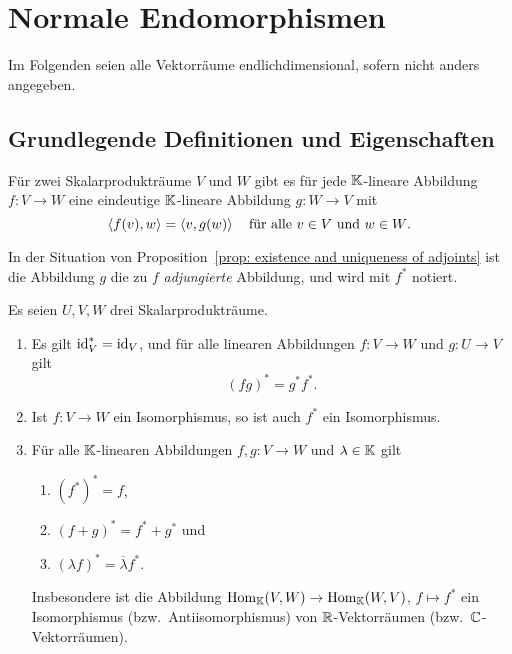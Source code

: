 \section{Normale Endomorphismen}
Im Folgenden seien alle Vektorräume endlichdimensional, sofern nicht anders angegeben.










\subsection{Grundlegende Definitionen und Eigenschaften}


\begin{proposition}\label{prop: existence and uniqueness of adjoints}
  Für zwei Skalarprodukträume $V$ und $W$ gibt es für jede $\mathbb{K}$-lineare Abbildung $f \colon V \to W$ eine eindeutige $\mathbb{K}$-lineare Abbildung $g \colon W \to V$ mit
  \[
    \left\langle f(v), w \right\rangle = \left\langle v, g(w) \right\rangle
    \quad
    \text{für alle $v \in V$ und $w \in W$}.
  \]
\end{proposition}


\begin{definition}
  In der Situation von Proposition~\ref{prop: existence and uniqueness of adjoints} ist die Abbildung $g$ die zu $f$ \emph{adjungierte} Abbildung, und wird mit $f^*$ notiert.
\end{definition}


\begin{proposition}
  Es seien $U, V, W$ drei Skalarprodukträume.
  \begin{enumerate}[leftmargin=*, label=\roman*)]
    \item
      Es gilt $\operatorname{id}_V^* = \operatorname{id}_V$, und für alle linearen Abbildungen $f \colon V \to W$ und $g \colon U \to V$ gilt
      \[
        (f g)^* = g^* f^*.
      \]
    \item
      Ist $f \colon V \to W$ ein Isomorphismus, so ist auch $f^*$ ein Isomorphismus.
    \item
      Für alle $\mathbb{K}$-linearen Abbildungen $f, g \colon V \to W$ und $\lambda \in \mathbb{K}$ gilt
      \begin{enumerate}[leftmargin=*, label=\alph*)]
        \item
          $(f^*)^* = f$,
        \item
          $(f + g)^* = f^* + g^*$ und
        \item
          $(\lambda f)^* = \overline{\lambda} f^*$.
      \end{enumerate}
      Insbesondere ist die Abbildung $\operatorname{Hom}_{\mathbb{K}}(V,W) \to \operatorname{Hom}_{\mathbb{K}}(W,V)$, $f \mapsto f^*$ ein Isomorphismus (bzw.\ Antiisomorphismus) von $\mathbb{R}$-Vektorräumen (bzw.\ $\mathbb{C}$-Vektorräumen).
  \end{enumerate}
\end{proposition}


